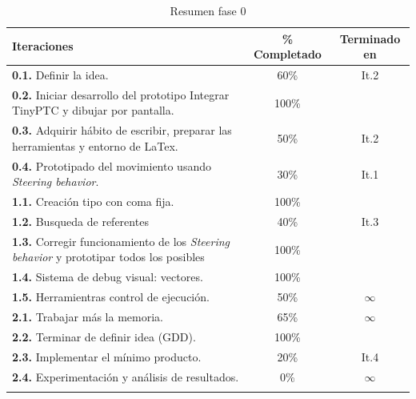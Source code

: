\begin{longtable}[c]{|p{7cm}|c|c|}
\hline
Iteraciones                                               & \% Completado    & Terminado en   \\ 
\hline
\textbf{0.1.} Definir la idea.                              & 60\%          & It.2         \\
	\cmidrule[.006pt]{1-3}
\textbf{0.2.} Iniciar desarrollo del prototipo
				Integrar TinyPTC y dibujar por pantalla.    & 100\%         &              \\
	\cmidrule[.006pt]{1-3}
\textbf{0.3.} Adquirir hábito de escribir, preparar
				las herramientas y entorno de LaTex.        & 50\%          & It.2         \\
	\cmidrule[.006pt]{1-3}
\textbf{0.4.} Prototipado del movimiento usando 
				\textit{Steering behavior}.                 & 30\%          & It.1         \\

\cmidrule[1pt]{1-3}

\textbf{1.1.} Creación tipo con coma fija.                  & 100\%         &              \\
	\cmidrule[.006pt]{1-3}
\textbf{1.2.} Busqueda de referentes                        & 40\%          & It.3         \\
	\cmidrule[.006pt]{1-3}
\textbf{1.3.} Corregir funcionamiento de los
				\textit{Steering behavior} y
				prototipar todos los posibles               & 100\%         &              \\
	\cmidrule[.006pt]{1-3}
\textbf{1.4.} Sistema de debug visual: vectores.            & 100\%         &              \\ 
	\cmidrule[.006pt]{1-3}
\textbf{1.5.} Herramientras control de ejecución.           & 50\%          & $\infty$     \\ 

\cmidrule[1pt]{1-3}

\textbf{2.1.} Trabajar más la memoria.                      & 65\%          & $\infty$     \\
	\cmidrule[.006pt]{1-3}
\textbf{2.2.} Terminar de definir idea (GDD).               & 100\%         &              \\
	\cmidrule[.006pt]{1-3}
\textbf{2.3.} Implementar el mínimo producto.               & 20\%          & It.4         \\
	\cmidrule[.006pt]{1-3}
\textbf{2.4.} Experimentación y análisis de resultados.     & 0\%           & $\infty$     \\
\hline
\caption{Resumen fase 0}
\end{longtable}


